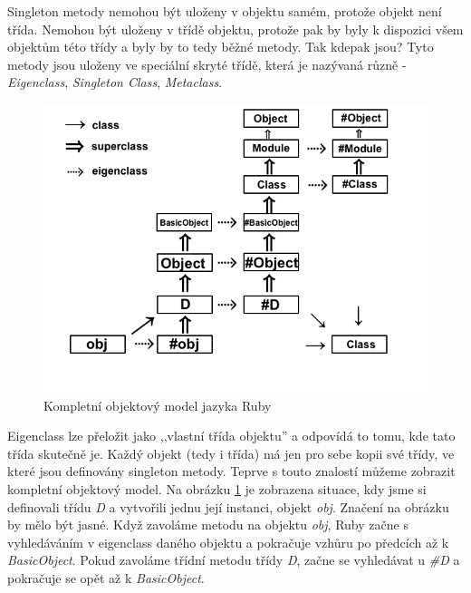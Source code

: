 \documentclass[12pt,a4paper,oneside]{article}
\begin{document}
Singleton metody nemohou být uloženy v objektu samém, protože objekt není třída. Nemohou být uloženy v třídě objektu, protože pak by byly k dispozici všem objektům této třídy a byly by to tedy běžné metody. Tak kdepak jsou? Tyto metody jsou uloženy ve speciální skryté třídě, která je nazývaná různě - \emph{Eigenclass}, \emph{Singleton Class}, \emph{Metaclass}. 
\begin{figure}[h]
\centering
\includegraphics[width=1\textwidth]{figures/object_model.png}
\caption{Kompletní objektový model jazyka Ruby}
\label{fig:object_model}
\end{figure}
Eigenclass lze přeložit jako ,,vlastní třída objektu'' a odpovídá to tomu, kde tato třída skutečně je. Každý objekt (tedy i třída) má jen pro sebe kopii své třídy, ve které jsou definovány singleton metody. Teprve s touto znalostí můžeme zobrazit kompletní objektový model. Na obrázku \ref{fig:object_model} je zobrazena situace, kdy jsme si definovali třídu \emph{D} a vytvořili jednu její instanci, objekt \emph{obj}. Značení na obrázku by mělo být jasné. Když zavoláme metodu na objektu \emph{obj}, Ruby začne s vyhledáváním v eigenclass daného objektu a pokračuje vzhůru po předcích až k \emph{BasicObject}. Pokud zavoláme třídní metodu třídy \emph{D}, začne se vyhledávat u \emph{\#D} a pokračuje se opět až k \emph{BasicObject}.
\end{document}
